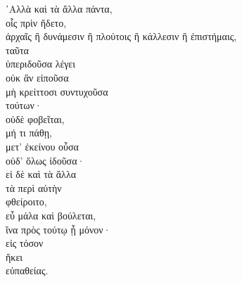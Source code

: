 {\large
\begin{greek}
\noindent ᾿Αλλὰ καὶ τὰ ἄλλα πάντα, \\
\tabto{2em} οἷς πρὶν ἥδετο, \\
\tabto{2em} ἀρχαῖς ἢ δυνάμεσιν ἢ πλούτοις ἢ κάλλεσιν ἢ ἐπιστήμαις, \\
ταῦτα \\
ὑπεριδοῦσα λέγει \\
\tabto{2em} οὐκ ἂν εἰποῦσα \\
\tabto{2em} μὴ κρείττοσι συντυχοῦσα \\
\tabto{4em} τούτων· \\
οὐδὲ φοβεῖται, \\
\tabto{2em} μή τι πάθῃ, \\
μετ' ἐκείνου οὖσα \\
οὐδ' ὅλως ἰδοῦσα· \\
εἰ δὲ καὶ τὰ ἄλλα \\
\tabto{2em} τὰ περὶ αὐτὴν \\
φθείροιτο, \\
εὖ μάλα καὶ βούλεται, \\
\tabto{2em} ἵνα πρὸς τούτῳ ᾖ μόνον· \\
εἰς τόσον \\
\tabto{2em} ἥκει \\
εὐπαθείας.\\

\end{greek}
}

